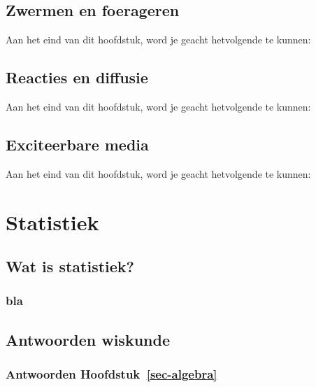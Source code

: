 \documentclass[
  a4paper,
]{scrbook}
\theoremstyle{definition}
\theoremstyle{remark}
\begin{document}
\hypertarget{zwermen-en-foerageren}{%
\chapter{Zwermen en foerageren}\label{zwermen-en-foerageren}}

Aan het eind van dit hoofdstuk, word je geacht hetvolgende te kunnen:

\hypertarget{reacties-en-diffusie}{%
\chapter{Reacties en diffusie}\label{reacties-en-diffusie}}

Aan het eind van dit hoofdstuk, word je geacht hetvolgende te kunnen:

\hypertarget{exciteerbare-media}{%
\chapter{Exciteerbare media}\label{exciteerbare-media}}

Aan het eind van dit hoofdstuk, word je geacht hetvolgende te kunnen:

\part{Statistiek}

\hypertarget{wat-is-statistiek}{%
\chapter{Wat is statistiek?}\label{wat-is-statistiek}}

\hypertarget{bla}{%
\section{bla}\label{bla}}

\cleardoublepage
{}
{}
\appendix

\hypertarget{antwoorden-wiskunde}{%
\chapter*{Antwoorden wiskunde}\label{antwoorden-wiskunde}}


\hypertarget{antwoorden-sec-algebra}{%
\section*{\texorpdfstring{Antwoorden
Hoofdstuk~\ref{sec-algebra}}{Antwoorden Hoofdstuk~}}\label{antwoorden-sec-algebra}}
\end{document}
